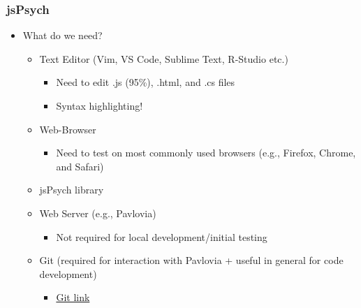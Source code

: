 \documentclass[t]{beamer}
\begin{document}
\begin{frame}[fragile]
    \frametitle{jsPsych}
    \begin{itemize}
        \item What do we need?
            \begin{itemize}
                \item Text Editor (Vim, VS Code, Sublime Text, R-Studio etc.)
                    \begin{itemize}
                        \item Need to edit .js (95\%), .html, and .cs files
                        \item Syntax highlighting!
                    \end{itemize}
                \item Web-Browser  
                    \begin{itemize}
                        \item Need to test on most commonly used browsers (e.g., Firefox, Chrome, and Safari)
                    \end{itemize}
                \item jsPsych library
                \item Web Server (e.g., Pavlovia)
                    \begin{itemize}
                        \item Not required for local development/initial testing
                    \end{itemize}
                \item Git (required for interaction with Pavlovia + useful in general for code development) 
                    \begin{itemize}
                        \item \href{https://git-scm.com/}{Git link}
                    \end{itemize}
            \end{itemize}
    \end{itemize}
\end{frame}
\end{document}

